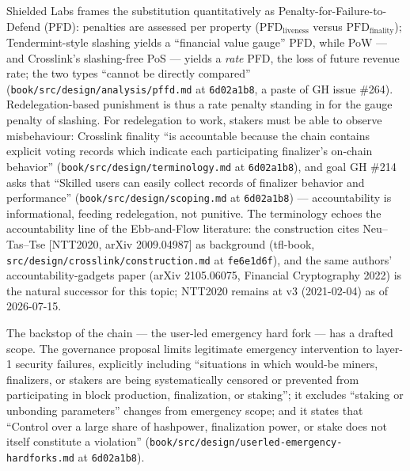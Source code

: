 \documentclass[11pt,a4paper]{article}
\theoremstyle{definition}
\begin{document}
Shielded Labs frames the substitution quantitatively as
Penalty-for-Failure-to-Defend (PFD): penalties are assessed per property
($\mathrm{PFD}_{\mathrm{liveness}}$ versus
$\mathrm{PFD}_{\mathrm{finality}}$); Tendermint-style slashing yields a
``financial value gauge'' PFD, while PoW --- and Crosslink's
slashing-free PoS --- yields a \emph{rate} PFD, the loss of future
revenue rate; the two types ``cannot be directly compared''
(\texttt{book/src/design/analysis/pffd.md} at \texttt{6d02a1b8}, a paste
of GH issue \#264). Redelegation-based punishment is thus a rate penalty
standing in for the gauge penalty of slashing. For redelegation to work,
stakers must be able to observe misbehaviour: Crosslink finality ``is
accountable because the chain contains explicit voting records which
indicate each participating finalizer's on-chain behavior''
(\texttt{book/src/design/terminology.md} at \texttt{6d02a1b8}), and goal
GH \#214 asks that ``Skilled users can easily collect records of
finalizer behavior and performance''
(\texttt{book/src/design/scoping.md} at \texttt{6d02a1b8}) ---
accountability is informational, feeding redelegation, not punitive. The
terminology echoes the accountability line of the Ebb-and-Flow
literature: the construction cites Neu--Tas--Tse [NTT2020, arXiv
2009.04987] as background (tfl-book,
\texttt{src/design/crosslink/construction.md} at \texttt{fe6e1d6f}), and
the same authors' accountability-gadgets paper (arXiv 2105.06075,
Financial Cryptography 2022) is the natural successor for this topic;
NTT2020 remains at v3 (2021-02-04) as of 2026-07-15.

The backstop of the chain --- the user-led emergency hard fork --- has a
drafted scope. The governance proposal limits legitimate emergency
intervention to layer-1 security failures, explicitly including
``situations in which would-be miners, finalizers, or stakers are being
systematically censored or prevented from participating in block
production, finalization, or staking''; it excludes ``staking or
unbonding parameters'' changes from emergency scope; and it states that
``Control over a large share of hashpower, finalization power, or stake
does not itself constitute a violation''
(\texttt{book/src/design/userled-emergency-hardforks.md} at
\texttt{6d02a1b8}).
\end{document}

